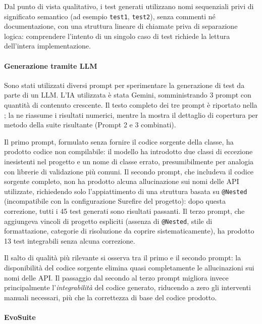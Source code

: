 Dal punto di vista qualitativo, i test generati utilizzano nomi
sequenziali privi di significato semantico (ad esempio \texttt{test1},
\texttt{test2}), senza commenti né documentazione, con una struttura
lineare di chiamate priva di separazione logica: comprendere l'intento
di un singolo caso di test richiede la lettura dell'intera
implementazione.

\paragraph{Generazione tramite LLM}

Sono stati utilizzati diversi prompt per sperimentare la generazione
di test da parte di un LLM. L'IA utilizzata è stata Gemini,
somministrando 3 prompt con quantità di contenuto crescente.
Il testo completo dei tre prompt è riportato nella
; la  ne
riassume i risultati numerici, mentre la
 mostra il dettaglio di copertura per
metodo della suite risultante (Prompt 2 e 3 combinati).

Il primo prompt, formulato senza fornire il codice sorgente della
classe, ha prodotto codice non compilabile: il modello ha introdotto
due classi di eccezione inesistenti nel progetto e un nome di classe
errato, presumibilmente per analogia con librerie di validazione più
comuni. Il secondo prompt, che includeva il codice sorgente completo,
non ha prodotto alcuna allucinazione sui nomi delle API utilizzate,
richiedendo solo l'appiattimento di una struttura basata su
\texttt{@Nested} (incompatibile con la configurazione Surefire del
progetto): dopo questa correzione, tutti i 45 test generati sono
risultati passanti. Il terzo prompt, che aggiungeva vincoli di
progetto espliciti (assenza di \texttt{@Nested}, stile di
formattazione, categorie di risoluzione da coprire sistematicamente),
ha prodotto 13 test integrabili senza alcuna correzione.

Il salto di qualità più rilevante si osserva tra il primo e il secondo
prompt: la disponibilità del codice sorgente elimina quasi
completamente le allucinazioni sui nomi delle API. Il passaggio dal
secondo al terzo prompt migliora invece principalmente
l'\emph{integrabilità} del codice generato, riducendo a zero gli
interventi manuali necessari, più che la correttezza di base del
codice prodotto.


\paragraph{EvoSuite}

